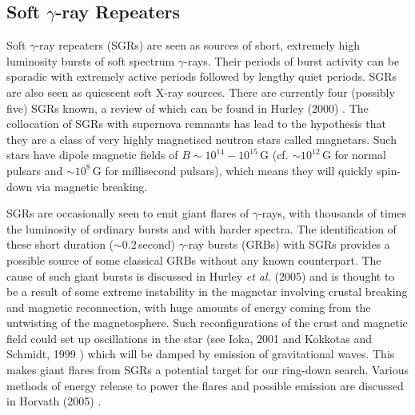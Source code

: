 \subsection{Soft $\gamma$-ray Repeaters}
Soft $\gamma$-ray repeaters (SGRs) are seen as sources of short, extremely high luminosity bursts of
soft spectrum $\gamma$-rays. Their periods of burst activity can be sporadic with extremely active
periods followed by lengthy quiet periods. SGRs are also seen as quiescent soft X-ray sources.
There are currently four (possibly five) SGRs known, a review of which can be found in Hurley (2000)
\cite{Hurley:2000}. The collocation of SGRs with supernova remnants has lead to the hypothesis that
they are a class of very highly magnetised neutron stars called magnetars. Such stars have
dipole magnetic fields of $B \sim 10^{14}-10^{15}$\,G (cf. $\sim 10^{12}$\,G for normal pulsars and
$\sim 10^8$\,G for millisecond pulsars), which means they will quickly spin-down via magnetic
breaking.

SGRs are occasionally seen to emit giant flares of $\gamma$-rays, with thousands of times the
luminosity of ordinary bursts and with harder spectra. The identification of these short duration
($\sim 0.2$\,second) $\gamma$-ray bursts (GRBs) with SGRs provides a possible source of some
classical GRBs without any known counterpart. The cause of such giant bursts is discussed in Hurley
{\it et al.} (2005) \cite{Hurley:2005} and is thought to be a result of some extreme instability in
the magnetar involving crustal breaking and magnetic reconnection, with huge amounts of energy
coming from the untwisting of the magnetosphere. Such reconfigurations of the crust and magnetic
field could set up oscillations in the star (see Ioka, 2001 \cite{Ioka:2001} and Kokkotas and
Schmidt, 1999 \cite{Kokkotas:1999}) which will be damped by emission of gravitational waves. This
makes giant flares from SGRs a potential target for our ring-down search. Various methods of energy
release to power the flares and possible \gw emission are discussed in Horvath (2005)
\cite{Horvath:2005}.

